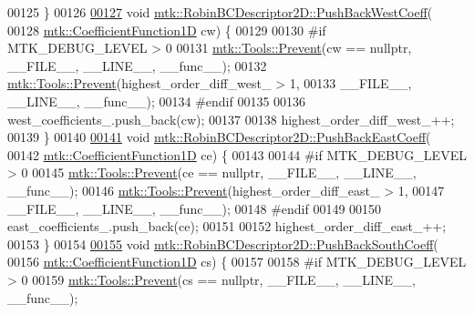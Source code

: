 \begin{DoxyCode}
00125 \}
00126 
\hypertarget{mtk__robin__bc__descriptor__2d_8cc_source_l00127}{}\hyperlink{classmtk_1_1RobinBCDescriptor2D_a671a38d5ea78be8f0a88ccf034d09987}{00127} \textcolor{keywordtype}{void} \hyperlink{classmtk_1_1RobinBCDescriptor2D_a671a38d5ea78be8f0a88ccf034d09987}{mtk::RobinBCDescriptor2D::PushBackWestCoeff}(
00128     \hyperlink{group__c07-mim__ops_gaa79593eeb6676d6011db339e01983909}{mtk::CoefficientFunction1D} cw) \{
00129 
00130 \textcolor{preprocessor}{  #if MTK\_DEBUG\_LEVEL > 0}
00131   \hyperlink{classmtk_1_1Tools_a332324c6f25e66be9dff48c5987a3b9f}{mtk::Tools::Prevent}(cw == \textcolor{keyword}{nullptr}, \_\_FILE\_\_, \_\_LINE\_\_, \_\_func\_\_);
00132   \hyperlink{classmtk_1_1Tools_a332324c6f25e66be9dff48c5987a3b9f}{mtk::Tools::Prevent}(highest\_order\_diff\_west\_ > 1,
00133                       \_\_FILE\_\_, \_\_LINE\_\_, \_\_func\_\_);
00134 \textcolor{preprocessor}{  #endif}
00135 
00136   west\_coefficients\_.push\_back(cw);
00137 
00138   highest\_order\_diff\_west\_++;
00139 \}
00140 
\hypertarget{mtk__robin__bc__descriptor__2d_8cc_source_l00141}{}\hyperlink{classmtk_1_1RobinBCDescriptor2D_a7cc1e6ca729b8b092eb73161eb244160}{00141} \textcolor{keywordtype}{void} \hyperlink{classmtk_1_1RobinBCDescriptor2D_a7cc1e6ca729b8b092eb73161eb244160}{mtk::RobinBCDescriptor2D::PushBackEastCoeff}(
00142     \hyperlink{group__c07-mim__ops_gaa79593eeb6676d6011db339e01983909}{mtk::CoefficientFunction1D} ce) \{
00143 
00144 \textcolor{preprocessor}{  #if MTK\_DEBUG\_LEVEL > 0}
00145   \hyperlink{classmtk_1_1Tools_a332324c6f25e66be9dff48c5987a3b9f}{mtk::Tools::Prevent}(ce == \textcolor{keyword}{nullptr}, \_\_FILE\_\_, \_\_LINE\_\_, \_\_func\_\_);
00146   \hyperlink{classmtk_1_1Tools_a332324c6f25e66be9dff48c5987a3b9f}{mtk::Tools::Prevent}(highest\_order\_diff\_east\_ > 1,
00147                       \_\_FILE\_\_, \_\_LINE\_\_, \_\_func\_\_);
00148 \textcolor{preprocessor}{  #endif}
00149 
00150   east\_coefficients\_.push\_back(ce);
00151 
00152   highest\_order\_diff\_east\_++;
00153 \}
00154 
\hypertarget{mtk__robin__bc__descriptor__2d_8cc_source_l00155}{}\hyperlink{classmtk_1_1RobinBCDescriptor2D_ad74c5d9f2c1d0359d350348ac2a7e61e}{00155} \textcolor{keywordtype}{void} \hyperlink{classmtk_1_1RobinBCDescriptor2D_ad74c5d9f2c1d0359d350348ac2a7e61e}{mtk::RobinBCDescriptor2D::PushBackSouthCoeff}(
00156     \hyperlink{group__c07-mim__ops_gaa79593eeb6676d6011db339e01983909}{mtk::CoefficientFunction1D} cs) \{
00157 
00158 \textcolor{preprocessor}{  #if MTK\_DEBUG\_LEVEL > 0}
00159   \hyperlink{classmtk_1_1Tools_a332324c6f25e66be9dff48c5987a3b9f}{mtk::Tools::Prevent}(cs == \textcolor{keyword}{nullptr}, \_\_FILE\_\_, \_\_LINE\_\_, \_\_func\_\_);

\end{DoxyCode}
